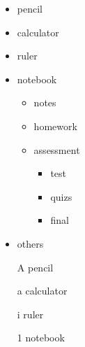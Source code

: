 \documentclass[12pt]{article}
\begin{document}
\vspace{1cm}
\begin{itemize}
\item pencil
\item calculator
\item ruler
\item notebook
	\begin{itemize}
	\item notes
	\item homework
	\item assessment
		\begin{itemize}
		\item test
		\item quizs
		\item final
		\end{itemize}
	\end{itemize}
\item others
\end{itemize}

\vspace{1cm}

\begin{enumerate}%

\item[A] pencil
\item[a] calculator
\item[i] ruler
\item[1] notebook

\end{enumerate}
\end{document}
